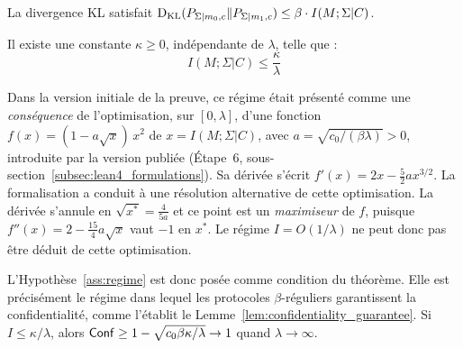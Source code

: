 \begin{sloppypar}
\begin{assumption}[R\'egularit\'e]
\label{ass:regularite}
La divergence KL satisfait $\operatorname{D_{\text{KL}}}(P_{\Sigma|m_0,c} \| P_{\Sigma|m_1,c})
\leq \beta \cdot I(M;\Sigma|C)$.
\end{assumption}

\begin{assumption}
\label{ass:regime}
Il existe une constante $\kappa \geq 0$, ind\'ependante de $\lambda$,
telle que :
\begin{equation}
I(M;\Sigma|C) \leq \frac{\kappa}{\lambda}
\label{eq:regime}
\end{equation}
\end{assumption}

\begin{remark}
\label{rem:statut_regime}
Dans la version initiale de la preuve, ce r\'egime \'etait pr\'esent\'e
comme une \emph{cons\'equence} de l'optimisation, sur $[0, \lambda]$, d'une
fonction $f(x) = (1 - a\sqrt{x})\,x^2$ de $x = I(M;\Sigma|C)$, avec $a = \sqrt{c_0/(\beta\lambda)} > 0$,
introduite par la version publi\'ee (\'Etape~6, sous-section~\ref{subsec:lean4_formulations}). Sa d\'eriv\'ee
s'\'ecrit $f'(x) = 2x - \frac{5}{2}ax^{3/2}$. La formalisation a conduit \`a une r\'esolution alternative de cette
optimisation. La d\'eriv\'ee s'annule en
$\sqrt{x^*} = \frac{4}{5a}$ et ce point est un \emph{maximiseur} de $f$, puisque
$f''(x) = 2 - \frac{15}{4}a\sqrt{x}$ vaut $-1$ en $x^*$. Le r\'egime
$I = O(1/\lambda)$ ne peut donc pas \^etre d\'eduit de cette
optimisation.

L'Hypoth\`ese~\ref{ass:regime} est donc pos\'ee
comme condition du th\'eor\`eme. Elle est pr\'ecis\'ement le r\'egime
dans lequel les protocoles $\beta$-r\'eguliers garantissent la
confidentialit\'e, comme l'\'etablit le
Lemme~\ref{lem:confidentiality_guarantee}. Si
$I \leq \kappa/\lambda$, alors
$\mathsf{Conf} \geq 1 - \sqrt{c_0 \beta \kappa/\lambda} \to 1$ quand
$\lambda \to \infty$.
\end{remark}
\end{sloppypar}


